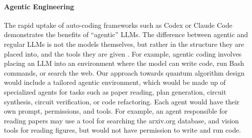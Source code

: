 \documentclass[letterpaper]{article} %
\begin{document}

\paragraph{Agentic Engineering}

The rapid uptake of auto-coding frameworks such as Codex or Claude Code demonstrates
the benefits of ``agentic'' LLMs. The difference between agentic and regular LLMs
is not the models themselves, but rather in the structure they are placed into, and the tools
they are given \cite{plaat2025agentic}.
For example, agentic coding involves placing an LLM into an environment where the model
can write code, run Bash commands, or search the web.
Our approach towards quantum algorithm design would include a tailored agentic environment,
which would be made up of specialized agents for tasks such as paper reading, plan generation,
circuit synthesis, circuit verification, or code refactoring.
Each agent would have their own prompt, permissions, and tools.
For example, an agent responsible for reading papers may use a tool for searching the arxiv.org database,
and vision tools for reading figures, but would not have permission to write and run code.
\end{document}
